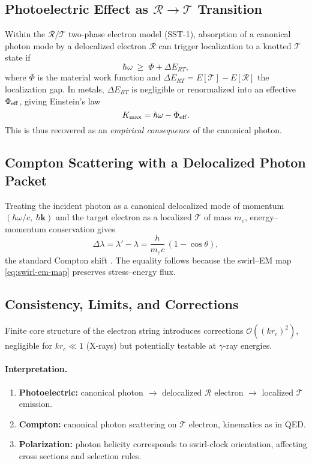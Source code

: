 \documentclass[11pt,a4paper]{article}
\begin{document}
    \subsection{Photoelectric Effect as $\mathcal R\!\to\!\mathcal T$ Transition}
    Within the $\mathcal R/\mathcal T$ two-phase electron model (SST-1),
    absorption of a canonical photon mode by a delocalized electron $\mathcal R$
    can trigger localization to a knotted $\mathcal T$ state if
    \begin{equation}
    \hbar\omega \;\ge\; \Phi + \Delta E_{RT},
    \end{equation}
    where $\Phi$ is the material work function and
    $\Delta E_{RT}=E[\mathcal T]-E[\mathcal R]$ the localization gap.
    In metals, $\Delta E_{RT}$ is negligible or renormalized into
    an effective $\Phi_{\rm eff}$, giving Einstein’s law
    \begin{equation}
    K_{\max}=\hbar\omega-\Phi_{\rm eff}.
    \end{equation}
    This is thus recovered as an \emph{empirical consequence} of the canonical photon.

    \subsection{Compton Scattering with a Delocalized Photon Packet}
    Treating the incident photon as a canonical delocalized mode of momentum
    $(\hbar\omega/c,\ \hbar\mathbf{k})$ and the target electron as a localized $\mathcal T$
    of mass $m_e$, energy--momentum conservation gives
    \begin{equation}
    \Delta\lambda=\lambda'-\lambda=\frac{h}{m_e c}\,(1-\cos\theta),
    \end{equation}
    the standard Compton shift \cite{Compton1923}.
    The equality follows because the swirl--EM map
    \eqref{eq:swirl-em-map} preserves stress--energy flux.

    \subsection{Consistency, Limits, and Corrections}
    Finite core structure of the electron string introduces
    corrections $\mathcal{O}((kr_c)^2)$, negligible for
    $kr_c\ll 1$ (X-rays) but potentially testable at $\gamma$-ray energies.

    \paragraph{Interpretation.}
    \begin{enumerate}
    \item \textbf{Photoelectric:} canonical photon $\to$ delocalized $\mathcal R$ electron $\to$ localized $\mathcal T$ emission.
    \item \textbf{Compton:} canonical photon scattering on $\mathcal T$ electron, kinematics as in QED.
    \item \textbf{Polarization:} photon helicity corresponds to swirl-clock orientation, affecting cross sections and selection rules.
    \end{enumerate}
\end{document}
